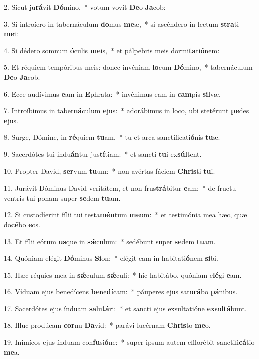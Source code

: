 2. Sicut ju\textbf{rá}vit \textbf{Dó}mino,~*  votum vovit \textbf{De}o \textbf{Ja}cob:\

3. Si introíero in tabernáculum \textbf{do}mus \textbf{me}æ,~*  si ascéndero in lectum \textbf{stra}ti \textbf{me}i:\

4. Si dédero somnum \textbf{ó}culis \textbf{me}is,~*  et pálpebris meis dormi\textbf{ta}ti\textbf{ó}nem:\

5. Et réquiem tempóribus meis: donec invéniam \textbf{lo}cum \textbf{Dó}mino,~*  tabernáculum \textbf{De}o \textbf{Ja}cob.\

6. Ecce audívimus \textbf{e}am in \textbf{E}phrata:~*  invénimus eam in \textbf{cam}pis \textbf{sil}væ.\

7. Introíbimus in taber\textbf{ná}culum \textbf{e}jus:~*  adorábimus in loco, ubi stetérunt \textbf{pe}des \textbf{e}jus.\

8. Surge, Dómine, in \textbf{ré}quiem \textbf{tu}am,~*  tu et arca sanctificati\textbf{ó}nis \textbf{tu}æ.\

9. Sacerdótes tui indu\textbf{án}tur jus\textbf{tí}tiam:~*  et sancti \textbf{tu}i ex\textbf{súl}tent.\

10. Propter David, \textbf{ser}vum \textbf{tu}um:~*  non avértas fáciem \textbf{Chris}ti \textbf{tu}i.\

11. Jurávit Dóminus David veritátem, et non frus\textbf{trá}bitur \textbf{e}am:~*  de fructu ventris tui ponam super \textbf{se}dem \textbf{tu}am.\

12. Si custodíerint fílii tui testa\textbf{mén}tum \textbf{me}um:~*  et testimónia mea hæc, quæ do\textbf{cé}bo \textbf{e}os.\

13. Et fílii eórum \textbf{us}que in \textbf{sǽ}culum:~*  sedébunt super \textbf{se}dem \textbf{tu}am.\

14. Quóniam elégit \textbf{Dó}minus \textbf{Si}on:~*  elégit eam in habitati\textbf{ó}nem \textbf{si}bi.\

15. Hæc réquies mea in \textbf{sǽ}culum \textbf{sǽ}culi:~*  hic habitábo, quóniam e\textbf{lé}gi \textbf{e}am.\

16. Víduam ejus benedícens \textbf{be}ne\textbf{dí}cam:~*  páuperes ejus satu\textbf{rá}bo \textbf{pá}nibus.\

17. Sacerdótes ejus índuam \textbf{sa}lu\textbf{tá}ri:~*  et sancti ejus exsultatióne \textbf{ex}sul\textbf{tá}bunt.\

18. Illuc prodúcam \textbf{cor}nu \textbf{Da}vid:~*  parávi lucérnam \textbf{Chris}to \textbf{me}o.\

19. Inimícos ejus índuam con\textbf{fu}si\textbf{ó}ne:~*  super ipsum autem efflorébit sanctifi\textbf{cá}tio \textbf{me}a.\

